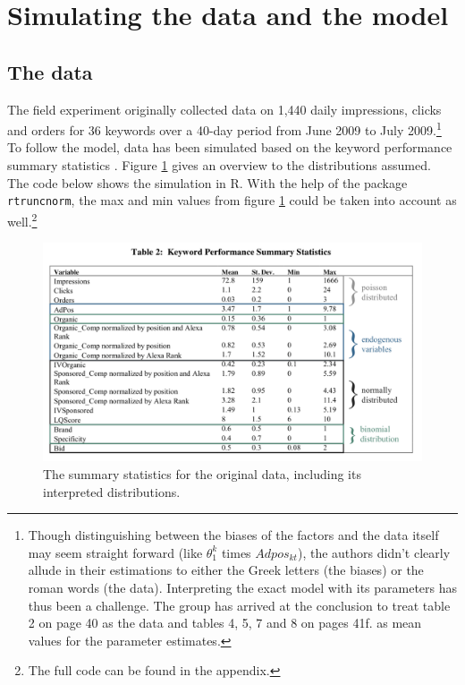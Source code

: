 \section{Simulating the data and the model} \label{sec:simulation}
\subsection{The data}

The field experiment originally collected data on 1,440 daily impressions, clicks and orders for 36 keywords over a 40-day period from June 2009 to July 2009.\footnote{Though distinguishing between the biases of the factors and the data itself may seem straight forward (like $\theta^k_1$ times $Adpos_{kt}$), the authors didn't clearly allude in their estimations to either the Greek letters (the biases) or the roman words (the data). Interpreting the exact model with its parameters has thus been a challenge. The group has arrived at the conclusion to treat table 2 on page 40 as the data and tables 4, 5, 7 and 8 on  pages 41f. as mean values for the parameter estimates.}
To follow the model, data has been simulated based on the keyword performance summary statistics \citep[table 2 on p. 40]{agarwal_organic_2015}. Figure \ref{fig:Data} gives an overview to the distributions assumed.\\
The code below shows the simulation in R. With the help of the package \texttt{rtruncnorm}, the max and min values from figure \ref{fig:Data} could be taken into account as well.\footnote{The full code can be found in the appendix.}



\begin{figure}
    \centering
    \includegraphics[scale=0.35]{Data}
    \caption{The summary statistics for the original data, including its interpreted distributions.\protect\footnotemark}
    \label{fig:Data}
\end{figure}

